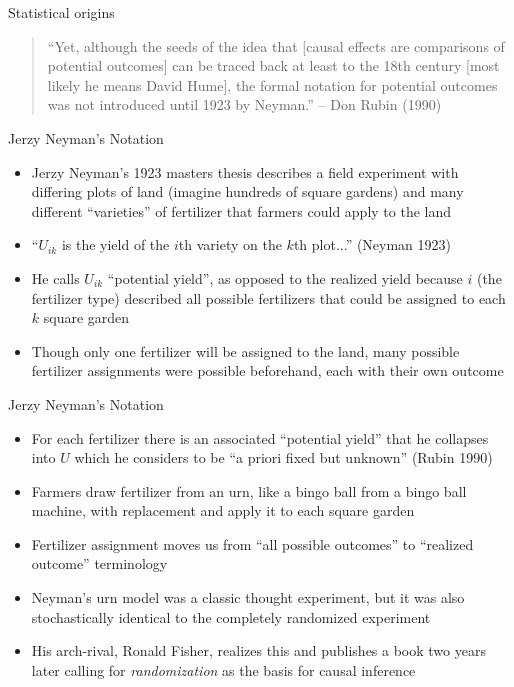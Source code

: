 \documentclass{beamer}
\begin{document}
\begin{frame}{Statistical origins}

\begin{quote}
``Yet, although the seeds of the idea that [causal effects are comparisons of potential outcomes] can be traced back at least to the 18th century [most likely he means David Hume], the formal notation for potential outcomes was not introduced until 1923 by Neyman.'' -- Don Rubin (1990)
\end{quote}

\end{frame}


\begin{frame}{Jerzy Neyman's Notation}

\begin{itemize}
\item Jerzy Neyman's 1923 masters thesis describes a field experiment with differing plots of land (imagine hundreds of square gardens) and many different ``varieties'' of fertilizer that farmers could apply to the land
\item ``$U_{ik}$ is the yield of the $i$th variety on the $k$th plot...'' (Neyman 1923)
\item He calls $U_{ik}$ ``potential yield'', as opposed to the realized yield because $i$ (the fertilizer type) described all possible fertilizers that could be assigned to each $k$ square garden
\item Though only one fertilizer will be assigned to the land, many possible fertilizer assignments were possible beforehand, each with their own outcome
\end{itemize}

\end{frame}

\begin{frame}{Jerzy Neyman's Notation}

\begin{itemize}

\item For each fertilizer there is an associated ``potential yield'' that he collapses into $U$ which he considers to be ``a priori fixed but unknown'' (Rubin 1990)
\item Farmers draw fertilizer from an urn, like a bingo ball from a bingo ball machine, with replacement and apply it to each square garden
\item Fertilizer assignment moves us from ``all possible outcomes'' to ``realized outcome'' terminology
\item Neyman's urn model was a classic thought experiment, but it was also stochastically identical to the completely randomized experiment
\item His arch-rival, Ronald Fisher, realizes this and publishes a book two years later calling for \emph{randomization} as the basis for causal inference
\end{itemize}

\end{frame}
\end{document}
